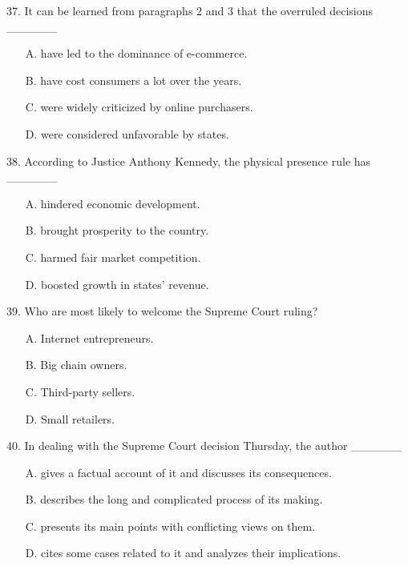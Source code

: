 \documentclass[UTF8,11pt]{ctexart}
\begin{document}
37. It can be learned from paragraphs 2 and 3 that the overruled decisions \_\_\_\_\_\_


\begin{itemize}[leftmargin=2em,itemsep=.2em,topsep=.4em]\item[A.] have led to the dominance of e-commerce.
\item[B.] have cost consumers a lot over the years.
\item[C.] were widely criticized by online purchasers.
\item[D.] were considered unfavorable by states.
\end{itemize}

38. According to Justice Anthony Kennedy, the physical presence rule has \_\_\_\_\_\_


\begin{itemize}[leftmargin=2em,itemsep=.2em,topsep=.4em]\item[A.] hindered economic development.
\item[B.] brought prosperity to the country.
\item[C.] harmed fair market competition.
\item[D.] boosted growth in states’ revenue.
\end{itemize}

39. Who are most likely to welcome the Supreme Court ruling?


\begin{itemize}[leftmargin=2em,itemsep=.2em,topsep=.4em]\item[A.] Internet entrepreneurs.
\item[B.] Big chain owners.
\item[C.] Third-party sellers.
\item[D.] Small retailers.
\end{itemize}

40. In dealing with the Supreme Court decision Thursday, the author \_\_\_\_\_\_


\begin{itemize}[leftmargin=2em,itemsep=.2em,topsep=.4em]\item[A.] gives a factual account of it and discusses its consequences.
\item[B.] describes the long and complicated process of its making.
\item[C.] presents its main points with conflicting views on them.
\item[D.] cites some cases related to it and analyzes their implications.
\end{itemize}
\end{document}
